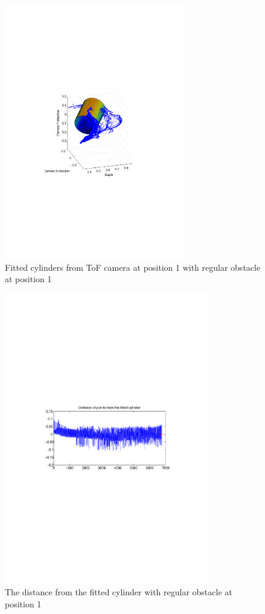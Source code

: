 \begin{figure}[htbp]
    \centering
    \includegraphics[width=0.7\textwidth]{pics/pos1-regular-tof-3d}
    \caption{Fitted cylinders from ToF camera at position 1 with regular obstacle at
    position 1}
    \label{chap7:fig-pos1-regular-tof-3d}
\end{figure}
\begin{figure}[htbp]
    \centering
    \includegraphics[width=0.8\textwidth]{pics/pos1-regular-tof-dist}
    \caption{The distance from the fitted cylinder with regular obstacle at position 1}
    \label{chap7:fig-pos1-regular-tof-dits}
\end{figure}
